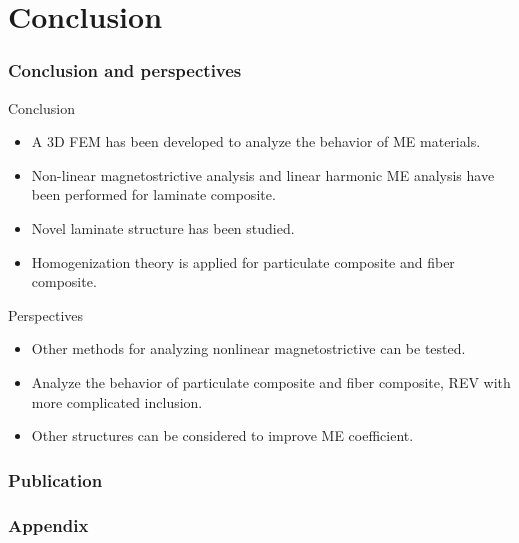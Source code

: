 \documentclass[compress]{beamer}
\begin{document}
\section{Conclusion}
\begin{frame}\frametitle{Conclusion and perspectives}
\begin{block}{Conclusion}
\begin{itemize}[label=$\bullet$, font=\small, leftmargin=*]
\item A 3D FEM has been developed to analyze the behavior of ME materials.
\item Non-linear magnetostrictive analysis  and linear harmonic ME analysis  have been performed for laminate composite. 
\item Novel laminate structure has been studied.
\item Homogenization theory is applied for particulate composite and fiber composite.
\end{itemize}
\end{block}
\begin{exampleblock}{Perspectives}
\begin{itemize} [label=$\bullet$, font=\small, leftmargin=*]
\item Other methods for analyzing nonlinear magnetostrictive can be tested.
\item Analyze the behavior of particulate composite and fiber composite, REV with more complicated inclusion.
\item Other structures can be considered to improve ME coefficient.
\end{itemize}
\end{exampleblock}
\end{frame}


\begin{frame}\frametitle{Publication}






\end{frame}

\begin{frame}\frametitle{Appendix}

\end{frame}

%        
%        
\end{document}
